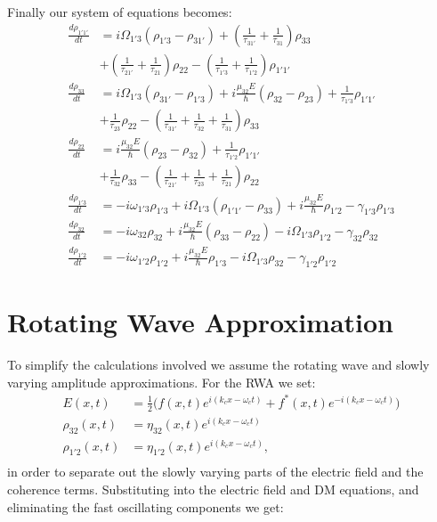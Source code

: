 \documentclass[10pt,english,fleqn]{article}%
\begin{document}
Finally our system of equations becomes:  
\begin{align}
\label{eq:mblochbase-start}
\frac{d \rho_{1'1'}}{d t} &= i\Omega_{1'3} (\rho_{1'3} - \rho_{31'}) + (\frac{1}{\tau_{31'}} + \frac{1}{\tau_{31}})\rho_{33}  \\ 
& + (\frac{1}{\tau_{21'}} + \frac{1}{\tau_{21}})\rho_{22} - (\frac{1}{\tau_{1'3}} + \frac{1}{\tau_{1'2}} )\rho_{1'1'} \\
\frac{d \rho_{33}}{d t}   &= i\Omega_{1'3} (\rho_{31'} - \rho_{1'3}) + i\frac{\mu_{32} E}{\hbar} (\rho_{32}-\rho_{23})+ \frac{1}{\tau_{1'3}} \rho_{1'1'} \nonumber \\ 
& +  \frac{1}{\tau_{23}}\rho_{22} - (\frac{1}{\tau_{31'}} + \frac{1}{\tau_{32}} + \frac{1}{\tau_{31}}) \rho_{33} \\
\frac{d \rho_{22}}{d t}   &= i\frac{\mu_{32} E}{\hbar} (\rho_{23}-\rho_{32}) + \frac{1}{\tau_{1'2}} \rho_{1'1'} \\ 
& +  \frac{1}{\tau_{32}}\rho_{33} - (\frac{1}{\tau_{21'}} + \frac{1}{\tau_{23}} + \frac{1}{\tau_{21}}) \rho_{22} \\
\frac{d \rho_{1'3}}{d t}  &= -i\omega_{1'3}\rho_{1'3} +i \Omega_{1'3}(\rho_{1'1'} - \rho_{33}) +i\frac{\mu_{32}E}{\hbar}\rho_{1'2} -\gamma_{1'3}\rho_{1'3} \\
\frac{d \rho_{32}}{d t}   &= -i\omega_{32}\rho_{32} +i \frac{\mu_{32}E}{\hbar}(\rho_{33}-\rho_{22}) -i\Omega_{1'3}\rho_{1'2} - \gamma_{32}\rho_{32} \\
\frac{d \rho_{1'2}}{d t}  &= -i\omega_{1'2}\rho_{1'2} +i\frac{\mu_{32}E}{\hbar}\rho_{1'3} -i\Omega_{1'3}\rho_{32} -\gamma_{1'2}\rho_{1'2} 
\label{eq:mblochbase-end}
\end{align}

\section{Rotating Wave Approximation}

To simplify the calculations involved we assume the rotating wave and slowly varying amplitude approximations. For the RWA we set: 
\begin{align}
  E(x,t) &= \frac{1}{2} \big ( f(x,t) e^{i(k_c x - \omega_c t )} + f^*(x,t)   e^{-i(k_c x - \omega_c  t )} \big ) \nonumber \\ 
  \rho_{32}(x,t)  &= \eta_{32}(x,t) e^{i(k_c x - \omega_c t ) } \nonumber \\
  \rho_{1'2}(x,t) &= \eta_{1'2}(x,t) e^{i(k_c x - \omega_c t) }, \\
\end{align}
in order to separate out the slowly varying parts of the electric field and the coherence terms. Substituting into the electric field and DM equations, and 
eliminating the fast oscillating components we get: 
\end{document}
